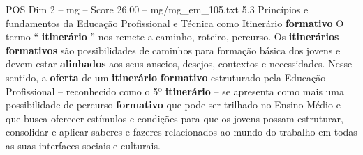 \begin{textsample}{POS Dim 2 – mg – Score 26.00 – mg/mg\_em\_105.txt}  \label{ex:f2_pos_194}
5.3 Princípios e fundamentos da Educação Profissional e Técnica como Itinerário \textbf{formativo} O termo “ \textbf{itinerário} ” nos remete a caminho, roteiro, percurso.
Os \textbf{itinerários} \textbf{formativos} são possibilidades de caminhos para formação básica dos jovens e devem estar \textbf{alinhados} aos seus anseios, desejos, contextos e necessidades.
Nesse sentido, a \textbf{oferta} de um \textbf{itinerário} \textbf{formativo} estruturado pela Educação Profissional – reconhecido como o 5º \textbf{itinerário} – se apresenta como mais uma possibilidade de percurso \textbf{formativo} que pode ser trilhado no Ensino Médio e que busca oferecer estímulos e condições para que os jovens possam estruturar, consolidar e aplicar saberes e fazeres relacionados ao mundo do trabalho em todas as suas interfaces sociais e culturais.

\end{textsample}
